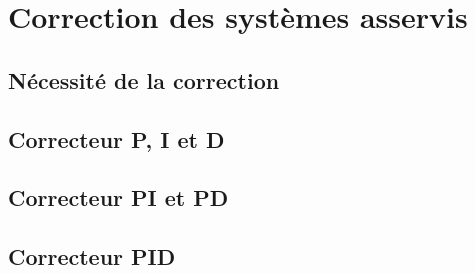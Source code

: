 \chapter{Correction des systèmes asservis\label{chap-correc}}

\minitoc
\newpage

\section{Nécessité de la correction}

\section{Correcteur P, I et D}

\section{Correcteur PI et PD}

\section{Correcteur PID}






